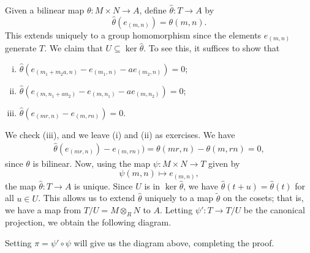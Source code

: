 \begin{pf}
    Given a bilinear map $\theta : M \times N \to A$, define 
    $\hat\theta : T \to A$ by 
    \[ \hat\theta(e_{(m,n)}) = \theta(m, n). \] 
    This extends uniquely to a group homomorphism since the elements 
    $e_{(m,n)}$ generate $T$. We claim that $U \subseteq 
    \ker\hat\theta$. To see this, it suffices to show that 
    \begin{enumerate}[(i)]
        \item $\hat\theta(e_{(m_1+m_2a, n)} - e_{(m_1, n)} 
        - ae_{(m_2, n)}) = 0$; 
        \item $\hat\theta(e_{(m,n_1+an_2)} - e_{(m,n_1)} - 
        ae_{(m,n_2)}) = 0$; 
        \item $\hat\theta(e_{(mr, n)} - e_{(m, rn)}) = 0$. 
    \end{enumerate}
    We check (iii), and we leave (i) and (ii) as exercises. We have 
    \begin{align*}
        \hat\theta(e_{(mr, n)}) - e_{(m, rn)}) = 
        \theta(mr, n) - \theta(m, rn) = 0, 
    \end{align*}
    since $\theta$ is bilinear. Now, using the map $\psi : M \times N \to T$ 
    given by 
    \[ \psi(m, n) \mapsto e_{(m, n)}, \] 
    the map $\hat\theta : T \to A$ is unique. Since $U$ is in $\ker\hat\theta$, 
    we have $\hat\theta(t + u) = \hat\theta(t)$ for all $u \in U$. This allows 
    us to extend $\hat\theta$ uniquely to a map $\tilde\theta$ on the cosets; 
    that is, we have a map from $T/U = M \otimes_R N$ to $A$. Letting 
    $\psi' : T \to T/U$ be the canonical projection, we obtain the following 
    diagram. 
    \begin{center}
    \end{center}
    Setting $\pi = \psi' \circ \psi$ will give us the diagram above, 
    completing the proof. 
\end{pf}

